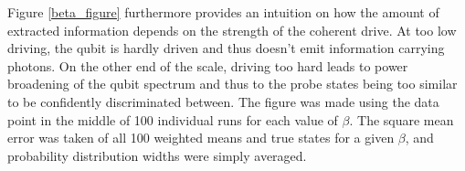 \documentclass[aps,pra,twocolumn,groupedaddress,showpacs]{revtex4}
\begin{document}
Figure \ref{beta_figure} furthermore provides an intuition on how the amount of extracted information depends on the strength of the coherent drive. At too low driving, the qubit is hardly driven and thus doesn't emit information carrying photons. On the other end of the scale, driving too hard leads to power broadening of the qubit spectrum and thus to the probe states being too similar to be confidently discriminated between. The figure was made using the data point in the middle of 100 individual runs for each value of $\beta$. The square mean error was taken of all 100 weighted means and true states for a given $\beta$, and probability distribution widths were simply averaged.
%
\end{document}
